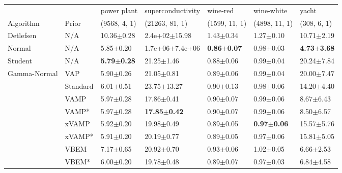 \begin{tabular}{lllllll}
\midrule
             &       &             power plant &        superconductivity &                wine-red &              wine-white &                   yacht \\
Algorithm & Prior& (9568, 4, 1)& (21263, 81, 1)& (1599, 11, 1)& (4898, 11, 1)& (308, 6, 1)\\
\midrule
Detlefsen & N/A &          10.36$\pm$0.28 &        2.4e+02$\pm$15.98 &           1.43$\pm$0.34 &           1.27$\pm$0.10 &          10.71$\pm$2.19 \\
Normal & N/A &           5.85$\pm$0.20 &      1.7e+06$\pm$7.4e+06 &  \textbf{0.86$\pm$0.07} &           0.98$\pm$0.03 &  \textbf{4.73$\pm$3.68} \\
Student & N/A &  \textbf{5.79$\pm$0.28} &           21.25$\pm$1.46 &           0.88$\pm$0.06 &           0.99$\pm$0.04 &          20.24$\pm$7.84 \\
Gamma-Normal & VAP &           5.90$\pm$0.26 &           21.05$\pm$0.81 &           0.89$\pm$0.06 &           0.99$\pm$0.04 &          20.00$\pm$7.47 \\
             & Standard &           6.01$\pm$0.51 &          23.75$\pm$13.27 &           0.90$\pm$0.13 &           0.98$\pm$0.06 &          14.20$\pm$4.40 \\
             & VAMP &           5.97$\pm$0.28 &           17.86$\pm$0.41 &           0.90$\pm$0.07 &           0.99$\pm$0.06 &           8.67$\pm$6.43 \\
             & VAMP* &           5.97$\pm$0.28 &  \textbf{17.85$\pm$0.42} &           0.90$\pm$0.07 &           0.99$\pm$0.06 &           8.50$\pm$6.57 \\
             & xVAMP &           5.92$\pm$0.20 &           19.98$\pm$0.49 &           0.89$\pm$0.05 &  \textbf{0.97$\pm$0.06} &          15.57$\pm$5.76 \\
             & xVAMP* &           5.91$\pm$0.20 &           20.19$\pm$0.77 &           0.89$\pm$0.05 &           0.97$\pm$0.06 &          15.81$\pm$5.05 \\
             & VBEM &           7.17$\pm$0.65 &           20.92$\pm$0.70 &           0.93$\pm$0.06 &           1.02$\pm$0.05 &           6.66$\pm$2.53 \\
             & VBEM* &           6.00$\pm$0.20 &           19.78$\pm$0.48 &           0.89$\pm$0.07 &           0.97$\pm$0.03 &           6.84$\pm$4.58 \\
\bottomrule
\end{tabular}

